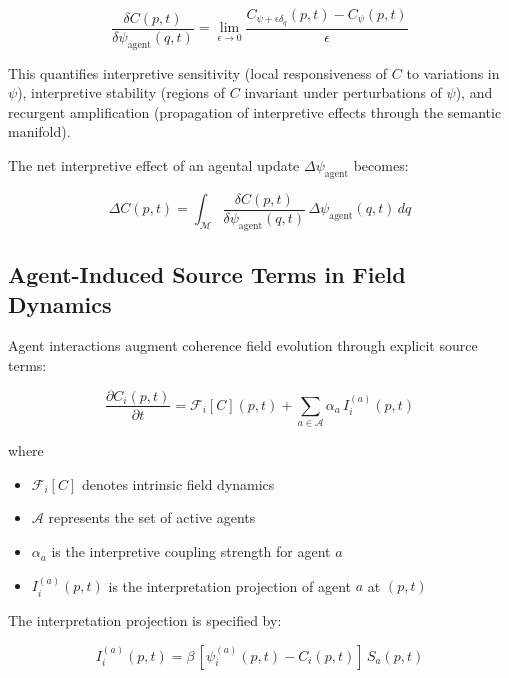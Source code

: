 \begin{equation}
\frac{\delta C(p, t)}{\delta \psi_{\mathrm{agent}}(q, t)} = \lim_{\epsilon \to 0} \frac{C_{\psi + \epsilon \delta_q}(p, t) - C_{\psi}(p, t)}{\epsilon}
\end{equation}

This quantifies interpretive sensitivity (local responsiveness of \(C\) to variations in \(\psi\)), interpretive stability (regions of \(C\) invariant under perturbations of \(\psi\)), and recurgent amplification (propagation of interpretive effects through the semantic manifold).

The net interpretive effect of an agental update \(\Delta \psi_{\mathrm{agent}}\) becomes:

\begin{equation}
\Delta C(p, t) = \int_{\mathcal{M}} \frac{\delta C(p, t)}{\delta \psi_{\mathrm{agent}}(q, t)}\, \Delta \psi_{\mathrm{agent}}(q, t)\, dq
\end{equation}

\subsection{Agent-Induced Source Terms in Field Dynamics}

Agent interactions augment coherence field evolution through explicit source terms:

\begin{equation}
\frac{\partial C_i(p, t)}{\partial t} = \mathcal{F}_i[C](p, t) + \sum_{a \in \mathcal{A}} \alpha_a\, I_i^{(a)}(p, t)
\end{equation}

where
\begin{itemize}
    \item \(\mathcal{F}_i[C]\) denotes intrinsic field dynamics
    \item \(\mathcal{A}\) represents the set of active agents
    \item \(\alpha_a\) is the interpretive coupling strength for agent \(a\)
    \item \(I_i^{(a)}(p, t)\) is the interpretation projection of agent \(a\) at \((p, t)\)
\end{itemize}

The interpretation projection is specified by:

\begin{equation}
I_i^{(a)}(p, t) = \beta\, [\psi_i^{(a)}(p, t) - C_i(p, t)]\, S_a(p, t)
\end{equation}

